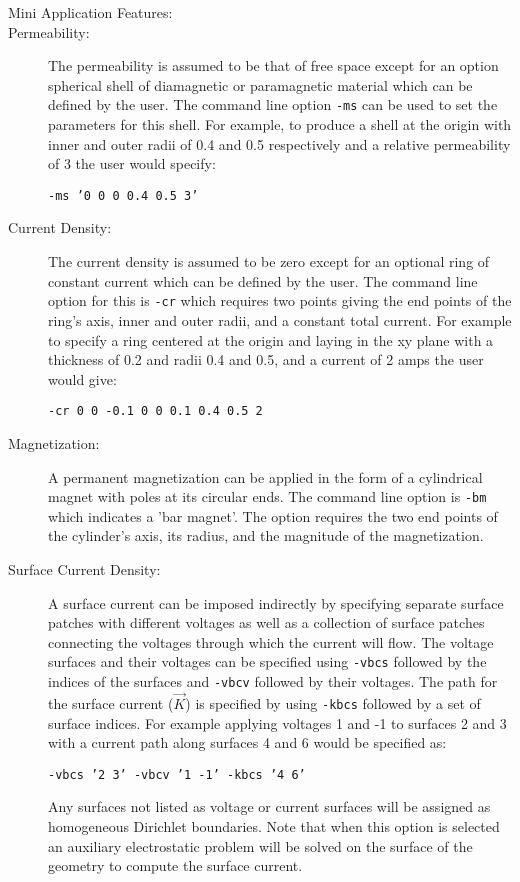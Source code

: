 \documentclass{article}
\begin{document}
\begin{description}
\item[Mini Application Features:]
\item[Permeability:] The permeability is assumed to be that of free
  space except for an option spherical shell of diamagnetic or
  paramagnetic material which can be defined by the user.  The command
  line option {\tt -ms} can be used to set the parameters for this
  shell.  For example, to produce a shell at the origin with inner and
  outer radii of 0.4 and 0.5 respectively and a relative permeability
  of 3 the user would specify:
  \begin{center}{\tt -ms '0 0 0 0.4 0.5 3'}\end{center}

\item[Current Density:] The current density is assumed to be zero
  except for an optional ring of constant current which can be defined
  by the user.  The command line option for this is {\tt -cr} which
  requires two points giving the end points of the ring's axis, inner
  and outer radii, and a constant total current.  For example to
  specify a ring centered at the origin and laying in the xy plane
  with a thickness of 0.2 and radii 0.4 and 0.5, and a current of 2
  amps the user would give:
  \begin{center}{\tt -cr 0 0 -0.1 0 0 0.1 0.4 0.5 2}\end{center}

\item[Magnetization:] A permanent magnetization can be applied in the
  form of a cylindrical magnet with poles at its circular ends.  The
  command line option is {\tt -bm} which indicates a 'bar magnet'.
  The option requires the two end points of the cylinder's axis, its
  radius, and the magnitude of the magnetization.

\item[Surface Current Density:] A surface current can be imposed
  indirectly by specifying separate surface patches with different
  voltages as well as a collection of surface patches connecting the
  voltages through which the current will flow.  The voltage surfaces
  and their voltages can be specified using {\tt -vbcs} followed by
  the indices of the surfaces and {\tt -vbcv} followed by their
  voltages.  The path for the surface current ($\vec{K}$) is specified
  by using {\tt -kbcs} followed by a set of surface indices.  For
  example applying voltages 1 and -1 to surfaces 2 and 3 with a
  current path along surfaces 4 and 6 would be specified as:
  \begin{center}{\tt -vbcs '2 3' -vbcv '1 -1' -kbcs '4 6'}\end{center}
  Any surfaces not listed as voltage or current surfaces will be
  assigned as homogeneous Dirichlet boundaries.  Note that when this
  option is selected an auxiliary electrostatic problem will be
  solved on the surface of the geometry to compute the surface
  current.


\end{description}
\end{document}
